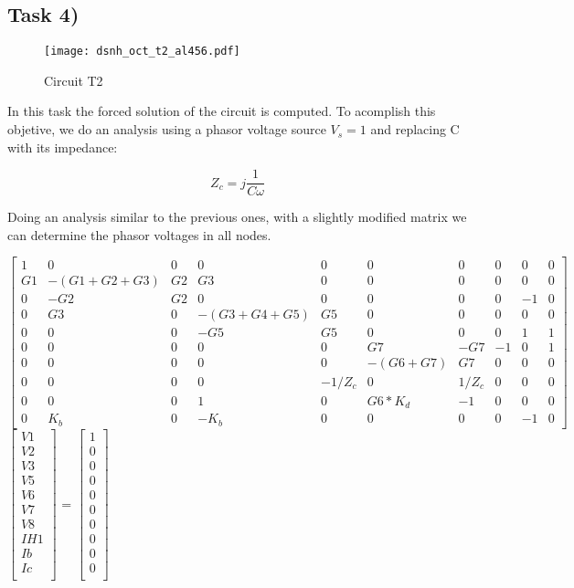 \subsection{Task 4)}
\label{subsec:task4_a}

\begin{figure}[H]
	\centering
	\texttt{[image: dsnh\_oct\_t2\_al456.pdf]}
	\caption{Circuit T2}
\label{fig:Dsnh_sim_t2}
\end{figure}
\newpage

In this task the forced solution of the circuit is computed. To acomplish this objetive, we do an analysis using a phasor voltage source $V_s=1$ and replacing C with its impedance:

\[
Z_c = j\frac{1}{C\omega}
\]

Doing an analysis similar to the previous ones, with a slightly modified matrix we can determine the phasor voltages in all nodes.

{\footnotesize
$ \begin{bmatrix}
1 & 0 & 0 & 0 & 0 & 0 & 0 & 0 & 0 & 0 \\
G1 & -(G1+G2+G3) & G2 & G3 & 0 & 0 & 0 & 0 & 0 & 0 \\
0 & -G2 & G2 & 0 & 0 & 0 & 0 & 0 & -1 & 0 \\
0 & G3 & 0 & -(G3+G4+G5) & G5 & 0 & 0 & 0 & 0 & 0 \\
0 & 0 & 0 & -G5 & G5 & 0 & 0 & 0 & 1 & 1 \\
0 & 0 & 0 & 0 & 0 & G7 & -G7 & -1 & 0 & 1 \\
0 & 0 & 0 & 0 & 0 & -(G6+G7) & G7 & 0 & 0 & 0 \\
0 & 0 & 0 & 0 & -1/Z_c & 0 & 1/Z_c & 0 & 0 & 0 \\
0 & 0 & 0 & 1 & 0 & G6*K_d & -1 & 0 & 0 & 0 \\
0 & K_b & 0 & -K_b & 0 & 0 & 0 & 0 & -1 & 0 
\end{bmatrix}  $
$ \begin{bmatrix}
V1 \\
V2 \\
V3 \\
V5 \\
V6 \\
V7 \\
V8 \\
IH1 \\
Ib\\
Ic\\
\end{bmatrix}  $
=
$ \begin{bmatrix}
1 \\
0 \\
0 \\
0 \\
0 \\
0 \\
0 \\
0 \\
0 \\
0 \\
\end{bmatrix}  $

}

